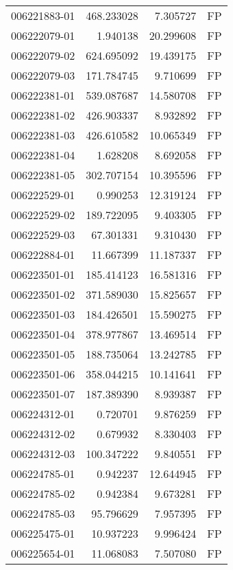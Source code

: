 \begin{tabular}{lrrl}
006221883-01 &  468.233028 &       7.305727 &   FP \\
006222079-01 &    1.940138 &      20.299608 &   FP \\
006222079-02 &  624.695092 &      19.439175 &   FP \\
006222079-03 &  171.784745 &       9.710699 &   FP \\
006222381-01 &  539.087687 &      14.580708 &   FP \\
006222381-02 &  426.903337 &       8.932892 &   FP \\
006222381-03 &  426.610582 &      10.065349 &   FP \\
006222381-04 &    1.628208 &       8.692058 &   FP \\
006222381-05 &  302.707154 &      10.395596 &   FP \\
006222529-01 &    0.990253 &      12.319124 &   FP \\
006222529-02 &  189.722095 &       9.403305 &   FP \\
006222529-03 &   67.301331 &       9.310430 &   FP \\
006222884-01 &   11.667399 &      11.187337 &   FP \\
006223501-01 &  185.414123 &      16.581316 &   FP \\
006223501-02 &  371.589030 &      15.825657 &   FP \\
006223501-03 &  184.426501 &      15.590275 &   FP \\
006223501-04 &  378.977867 &      13.469514 &   FP \\
006223501-05 &  188.735064 &      13.242785 &   FP \\
006223501-06 &  358.044215 &      10.141641 &   FP \\
006223501-07 &  187.389390 &       8.939387 &   FP \\
006224312-01 &    0.720701 &       9.876259 &   FP \\
006224312-02 &    0.679932 &       8.330403 &   FP \\
006224312-03 &  100.347222 &       9.840551 &   FP \\
006224785-01 &    0.942237 &      12.644945 &   FP \\
006224785-02 &    0.942384 &       9.673281 &   FP \\
006224785-03 &   95.796629 &       7.957395 &   FP \\
006225475-01 &   10.937223 &       9.996424 &   FP \\
006225654-01 &   11.068083 &       7.507080 &   FP \\

\end{tabular}
